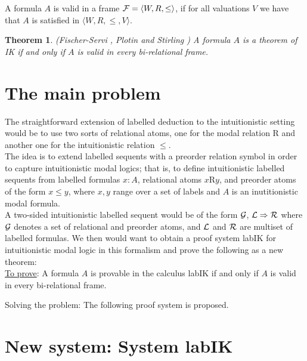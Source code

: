 \documentclass[11pt]{article}
\newtheorem{teo}{Theorem}
\begin{document}
A formula $A$ is valid in a frame $\mathcal{F} = \langle W, R, \le \rangle$, if for all valuations $V$ we have that $A$ is satisfied in $\langle W, R, \le, V \rangle$.

\begin{teo} (Fischer-Servi \cite{Fischer}, Plotin and Stirling \cite{Plotin})
 A formula $A$ is a theorem of IK if and only if $A$ is valid in every bi-relational frame.
\end{teo}

\section{The main problem}

The straightforward extension of labelled deduction to the intuitionistic setting would be to use two sorts of relational atoms, one for the modal relation R and another one for the intuitionistic relation $\le$.\\

The idea is to extend labelled sequents with a preorder relation symbol in order to capture intuitionistic modal logics; that is, to define intuitionistic labelled sequents from labelled formulas $x \colon A$, relational atoms $x$R$y$, and preorder atoms of the form $x \le y$, where $x, y$ range over a set of labels and $A$ is an inutitionistic modal formula.\\

A two-sided intuitionistic labelled sequent would be of the form $\mathcal{G}$, $\mathcal{L} \Rightarrow \mathcal{R}$ where $\mathcal{G}$ denotes a set of relational and preorder atoms, and $\mathcal{L}$ and $\mathcal{R}$ are multiset of labelled formulas. We then would want to obtain a proof system labIK for intuitionistic modal logic in this formalism and prove the following as a new theorem:\\

\underline{To prove}: A formula $A$ is provable in the calculus labIK if and only if $A$ is valid in every bi-relational frame.

\newpage

\begin{center}

Solving the problem: The following proof system is proposed.

\end{center}

\section{New system: System labIK}
\end{document}
